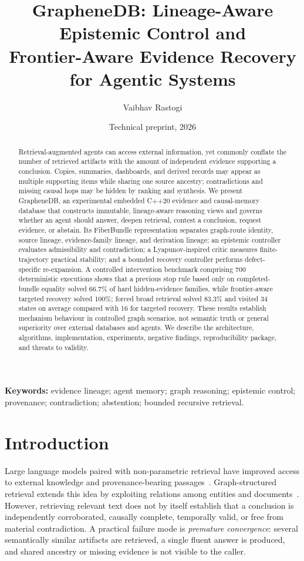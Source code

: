 \documentclass[10pt]{article}
\title{GrapheneDB: Lineage-Aware Epistemic Control and\\Frontier-Aware Evidence Recovery for Agentic Systems}
\author{Vaibhav Rastogi}
\date{Technical preprint, 2026}
\begin{document}
\maketitle

\begin{abstract}
Retrieval-augmented agents can access external information, yet commonly conflate the number of retrieved artifacts with the amount of independent evidence supporting a conclusion. Copies, summaries, dashboards, and derived records may appear as multiple supporting items while sharing one source ancestry; contradictions and missing causal hops may be hidden by ranking and synthesis. We present GrapheneDB, an experimental embedded C++20 evidence and causal-memory database that constructs immutable, lineage-aware reasoning views and governs whether an agent should answer, deepen retrieval, contest a conclusion, request evidence, or abstain. Its FiberBundle representation separates graph-route identity, source lineage, evidence-family lineage, and derivation lineage; an epistemic controller evaluates admissibility and contradiction; a Lyapunov-inspired critic measures finite-trajectory practical stability; and a bounded recovery controller performs defect-specific re-expansion. A controlled intervention benchmark comprising 700 deterministic executions shows that a previous stop rule based only on completed-bundle equality solved 66.7\% of hard hidden-evidence families, while frontier-aware targeted recovery solved 100\%; forced broad retrieval solved 83.3\% and visited 34 states on average compared with 16 for targeted recovery. These results establish mechanism behaviour in controlled graph scenarios, not semantic truth or general superiority over external databases and agents. We describe the architecture, algorithms, implementation, experiments, negative findings, reproducibility package, and threats to validity.
\end{abstract}

\noindent\textbf{Keywords:} evidence lineage; agent memory; graph reasoning; epistemic control; provenance; contradiction; abstention; bounded recursive retrieval.

\section{Introduction}
Large language models paired with non-parametric retrieval have improved access to external knowledge and provenance-bearing passages~\cite{lewis2020rag}. Graph-structured retrieval extends this idea by exploiting relations among entities and documents~\cite{edge2024graphrag}. However, retrieving relevant text does not by itself establish that a conclusion is independently corroborated, causally complete, temporally valid, or free from material contradiction. A practical failure mode is \emph{premature convergence}: several semantically similar artifacts are retrieved, a single fluent answer is produced, and shared ancestry or missing evidence is not visible to the caller.
\end{document}
